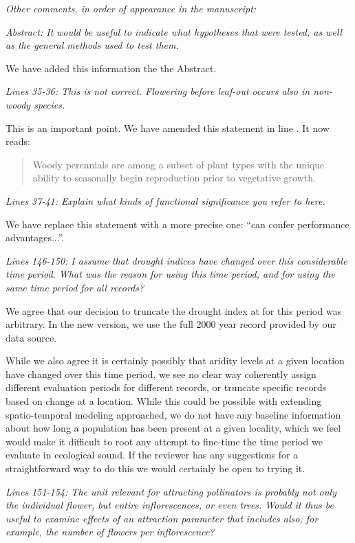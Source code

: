 \documentclass{article}[12pt]
\begin{document}
\emph{Other comments, in order of appearance in the manuscript:}

\emph{Abstract: It would be useful to indicate what hypotheses that were tested, as well as the general methods used to test them.}

We have added this information the the Abstract.

\emph{Lines 35-36: This is not correct. Flowering before leaf-out occurs also in non-woody species.}


This is an important point. We have amended this statement in line . It now reads:
\begin{quote} Woody perennials are among a subset of plant types with the unique ability to seasonally begin reproduction prior to vegetative growth.\end{quote}

\emph{Lines 37-41: Explain what kinds of functional significance you refer to here.}

We have replace this statement with a more precise one: ``can confer performance advantages...''.

\emph{Lines 146-150: I assume that drought indices have changed over this considerable time period. What was the reason for using this time period, and for using the same time period for all records?}

We agree that our decision to truncate the drought index at for this period was arbitrary. In the new version, we use the full 2000 year record provided by our data source.

While we also agree it is certainly possibly that aridity levels at a given location have changed over this time period, we see no clear way coherently assign different evaluation periods for different records, or truncate specific records based on change at a location. While this could be possible with extending spatio-temporal modeling approached, we do not have any baseline information about how long a population has been present at a given locality, which we feel would make it difficult to root any attempt to fine-time the time period we evaluate in ecological sound. If the reviewer has any suggestions for a straightforward way to do this we would certainly be open to trying it.


\emph{Lines 151-154: The unit relevant for attracting pollinators is probably not only the individual flower, but entire inflorescences, or even trees. Would it thus be useful to examine effects of an attraction parameter that includes also, for example, the number of flowers per inflorescence?}
\end{document}
